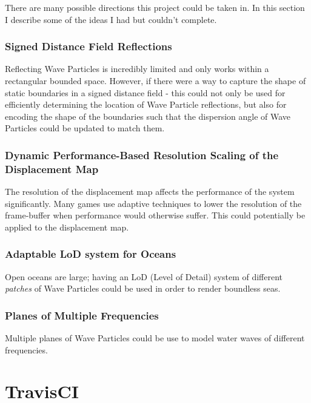 \documentclass[12pt,a4paper,twoside]{report}
\begin{document}
There are many possible directions this project could be taken in. In this
section I describe some of the ideas I had but couldn't complete.

\subsection{Signed Distance Field Reflections}

Reflecting Wave Particles is incredibly limited and only works within a
rectangular bounded space. However, if there were a way to capture the shape of
static boundaries in a signed distance field - this could not only be used for
efficiently determining the location of Wave Particle reflections, but also for
encoding the shape of the boundaries such that the dispersion angle of Wave
Particles could be updated to match them.

\subsection{Dynamic Performance-Based Resolution Scaling of the Displacement Map}

The resolution of the displacement map affects the performance of the system
significantly. Many games use adaptive techniques to lower the resolution of
the frame-buffer when performance would otherwise suffer. This could
potentially be applied to the displacement map.

\subsection{Adaptable LoD system for Oceans}

Open oceans are large; having an LoD (Level of Detail) system of different
\textit{patches} of Wave Particles could be used in order to render boundless
seas.

\subsection{Planes of Multiple Frequencies}

Multiple planes of Wave Particles could be use to model water waves of
different frequencies.





\appendix

\chapter{TravisCI}
\label{app:travisci}
\end{document}
